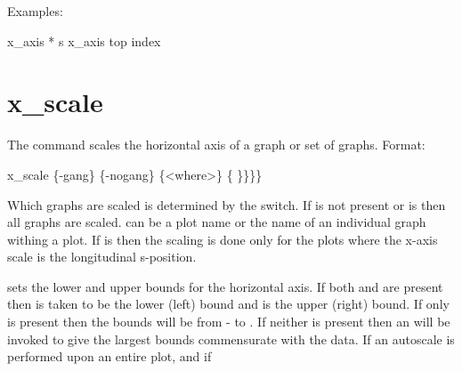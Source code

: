 {{{{{{{Examples:
\begin{example}
  x_axis * s
  x_axis top index
\end{example}

\section{x_scale}
\label{s:x.scale}

The  command scales the horizontal axis of a graph or set of graphs. Format:
\begin{example}
  x_scale \{-gang\} \{-nogang\} \{<where>\} \{<value1> \}<value2>\}\}\}
\end{example}

Which graphs are scaled is determined by the  switch. If  is not
present or  is \vn{*} then all graphs are scaled.  can be a plot
name or the name of an individual graph withing a plot.  If  is  then
the scaling is done only for the plots where the x-axis scale is the longitudinal
s-position.

\vskip 7pt 

 sets the lower and upper bounds for the horizontal axis.  If both
 and  are present then  is taken to be the lower
(left) bound and  is the upper (right) bound. If only  is
present then the bounds will be from - to .  If neither is
present then an  will be invoked to give the largest bounds commensurate
with the data. If an autoscale is performed upon an entire plot, and if
\vn{plot%
same for all graphs. That is, a single scale is calculated so that all the data of all the
graphs is within the plot region. The affect of \vn{plot%
overridden by using the \vn{-gang} or \vn{-nogang} switches.

Note: The \vn{x_scale} command will vary the number of major divisions (set by
plot%
can be that if two plots have the same range of data but differing major division
settings, the \vn{x_scale} command can produce differing results.

Example:
\begin{example}
  x_scale                 ! Autoscale all x-axes.
  x_scale * 0 100         ! Scale all x-axes to go from 0 to 100.
\end{example}

}}}}}}}}}
